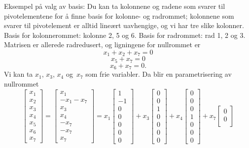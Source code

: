 \begin{losning}
\begin{punkt}
\noindent
Eksempel på valg av basis: Du kan ta kolonnene og radene som svarer til pivotelementene for å finne basis for kolonne- og radrommet; kolonnene som svarer til pivotelement er alltid lineært uavhengige, og vi har tre slike kolonner. Basis for kolonnerommet: kolonne 2, 5 og 6. Basis for radrommet: rad 1, 2 og 3. Matrisen er allerede radredusert, og ligningene for nullrommet er $$x_1+x_2+x_7=0$$ $$x_5+x_7=0$$ $$x_6+x_7=0.$$ Vi kan ta $x_1$, $x_3$, $x_4$ og~$x_7$ som frie variabler. Da blir en parametrisering av nullrommet
$$\begin{bmatrix}
x_1\\
x_2\\
x_3\\
x_4\\
x_5\\
x_6\\
x_7
\end{bmatrix}=\begin{bmatrix}
x_1\\
-x_1-x_7\\
x_3\\
x_4\\
-x_7\\
-x_7\\
x_7
\end{bmatrix}=x_1\begin{bmatrix}
1\\
-1\\
0\\
0\\
0\\
0\\
0
\end{bmatrix}+x_3\begin{bmatrix}
0\\
0\\
1\\
0\\
0\\
0\\
0
\end{bmatrix}+x_4\begin{bmatrix}
0\\
0\\
0\\
1\\
0\\
0\\
0
\end{bmatrix}+x_7\begin{bmatrix}
0\\
0\\

\end{bmatrix}$$
\end{punkt}
\end{losning}
